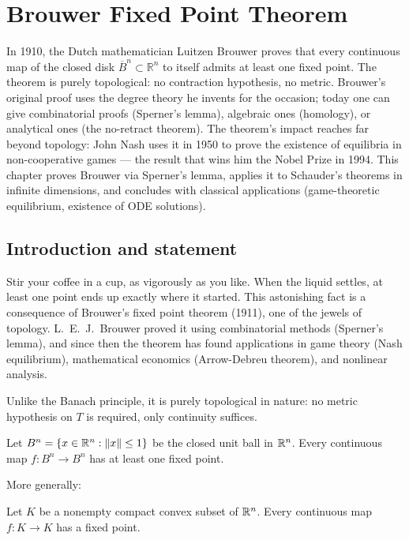 \chapter{Brouwer Fixed Point Theorem}\label{ch:brouwer}

In 1910, the Dutch mathematician Luitzen Brouwer proves that every continuous map of the closed disk $\overline{B}^n \subset \mathbb{R}^n$ to itself admits at least one fixed point. The theorem is purely topological: no contraction hypothesis, no metric. Brouwer's original proof uses the degree theory he invents for the occasion; today one can give combinatorial proofs (Sperner's lemma), algebraic ones (homology), or analytical ones (the no-retract theorem). The theorem's impact reaches far beyond topology: John Nash uses it in 1950 to prove the existence of equilibria in non-cooperative games --- the result that wins him the Nobel Prize in 1994. This chapter proves Brouwer via Sperner's lemma, applies it to Schauder's theorems in infinite dimensions, and concludes with classical applications (game-theoretic equilibrium, existence of ODE solutions).

\section{Introduction and statement}

Stir your coffee in a cup, as vigorously as you like. When the liquid settles, at least one point ends up exactly where it started. This astonishing fact is a consequence of Brouwer's fixed point theorem (1911), one of the jewels of topology. L.~E.~J.\ Brouwer proved it using combinatorial methods (Sperner's lemma), and since then the theorem has found applications in game theory (Nash equilibrium), mathematical economics (Arrow-Debreu theorem), and nonlinear analysis.

Unlike the Banach principle, it is purely topological in nature: no metric
hypothesis on $T$ is required, only continuity suffices.

\begin{theorem}[Brouwer, 1911]\label{thm:brouwer}
Let $B^n = \{ x \in \mathbb{R}^n : \left\| x \right\| \leq 1 \}$ be the closed unit ball in
$\mathbb{R}^n$. Every continuous map $f : B^n \to B^n$ has at least one fixed point.
\end{theorem}

More generally:

\begin{theorem}
Let $K$ be a nonempty compact convex subset of $\mathbb{R}^n$. Every continuous map
$f : K \to K$ has a fixed point.
\end{theorem}

